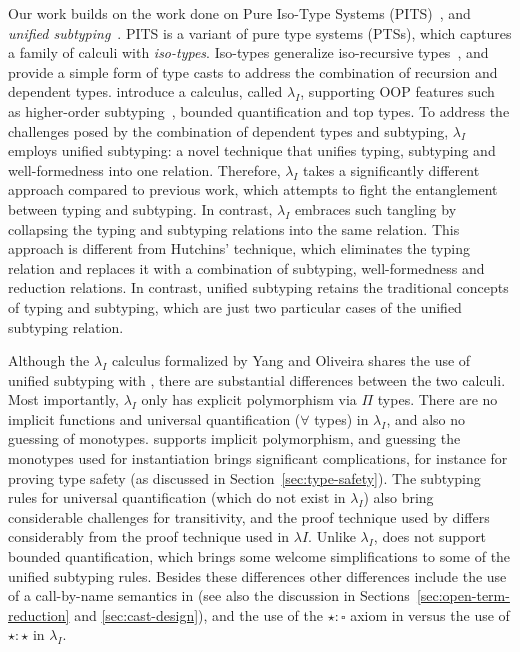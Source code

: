 Our work builds on the work done on Pure Iso-Type Systems (PITS)~\citep{yang2019pure}, and
\emph{unified subtyping}~\citep{full}. PITS is a variant of pure type systems (PTSs),
which captures a family of calculi with \emph{iso-types}.
Iso-types generalize iso-recursive
types~\citep{tapl}, and provide a simple form of
type casts to address the combination of recursion and
dependent types.
\cite{full} introduce a calculus, called $\lambda_{I}$, supporting OOP features such as
higher-order subtyping~\citep{fsubo}, bounded quantification and
top types.
To address the challenges posed by
the combination of dependent types and subtyping, $\lambda_{I}$
employs unified subtyping: a novel technique that unifies
typing, subtyping and well-formedness into one
relation. Therefore, $\lambda_{I}$ takes a significantly different
approach compared to previous work, which
attempts to fight the entanglement between typing and subtyping. In
contrast, $\lambda_{I}$ embraces such
tangling by collapsing the typing and subtyping
relations into the same relation. This approach is different from
Hutchins' technique, which eliminates the typing relation and replaces it with
a combination of subtyping, well-formedness and reduction relations.
In contrast, unified subtyping
retains the traditional concepts of typing and subtyping, which are just two
particular cases of the unified subtyping relation.

Although the $\lambda_{I}$ calculus formalized by Yang and Oliveira shares the use
of unified subtyping with \name, there are substantial differences between the two calculi.
Most importantly, $\lambda_{I}$ only has explicit polymorphism via $\Pi$ types. There
are no implicit functions and universal quantification ($\forall$ types) in $\lambda_{I}$,
and also no guessing of monotypes. \name supports implicit polymorphism, and
guessing the monotypes used for instantiation brings significant complications, for instance
for proving type safety (as discussed in Section~\ref{sec:type-safety}).
The subtyping rules for universal quantification (which do not exist in $\lambda_{I}$) also
bring considerable challenges for transitivity, and the proof technique used by
\name differs considerably from the proof technique used in $\lambda{I}$.
Unlike $\lambda_{I}$, \name does not support bounded quantification, which brings
some welcome simplifications to some of the unified subtyping rules.
Besides these differences other differences include the use of a call-by-name
semantics in \name (see also the discussion in Sections~\ref{sec:open-term-reduction} and \ref{sec:cast-design}),
and the use of the $\star : \square$ axiom in \name versus the use of $\star : \star$
in $\lambda_{I}$.

